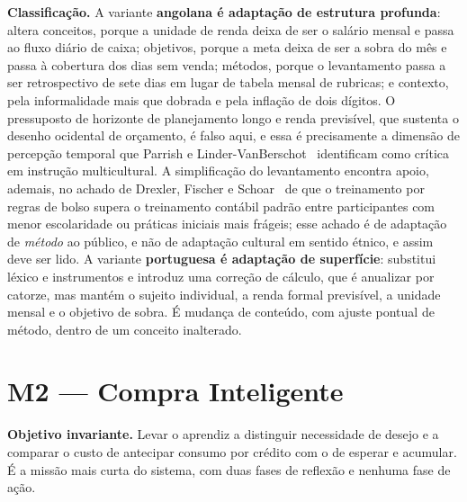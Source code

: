 \noindent\textbf{Classificação.} A variante \textbf{angolana é adaptação de estrutura profunda}: altera conceitos, porque a unidade de renda deixa de ser o salário mensal e passa ao fluxo diário de caixa; objetivos, porque a meta deixa de ser a sobra do mês e passa à cobertura dos dias sem venda; métodos, porque o levantamento passa a ser retrospectivo de sete dias em lugar de tabela mensal de rubricas; e contexto, pela informalidade mais que dobrada e pela inflação de dois dígitos. O pressuposto de horizonte de planejamento longo e renda previsível, que sustenta o desenho ocidental de orçamento, é falso aqui, e essa é precisamente a dimensão de percepção temporal que Parrish e Linder-VanBerschot~\cite{parrish2010} identificam como crítica em instrução multicultural. A simplificação do levantamento encontra apoio, ademais, no achado de Drexler, Fischer e Schoar~\cite{drexler2014} de que o treinamento por regras de bolso supera o treinamento contábil padrão entre participantes com menor escolaridade ou práticas iniciais mais frágeis; esse achado é de adaptação de \emph{método} ao público, e não de adaptação cultural em sentido étnico, e assim deve ser lido. A variante \textbf{portuguesa é adaptação de superfície}: substitui léxico e instrumentos e introduz uma correção de cálculo, que é anualizar por catorze, mas mantém o sujeito individual, a renda formal previsível, a unidade mensal e o objetivo de sobra. É mudança de conteúdo, com ajuste pontual de método, dentro de um conceito inalterado.

\section*{M2 --- Compra Inteligente}

\noindent\textbf{Objetivo invariante.} Levar o aprendiz a distinguir necessidade de desejo e a comparar o custo de antecipar consumo por crédito com o de esperar e acumular. É a missão mais curta do sistema, com duas fases de reflexão e nenhuma fase de ação.

